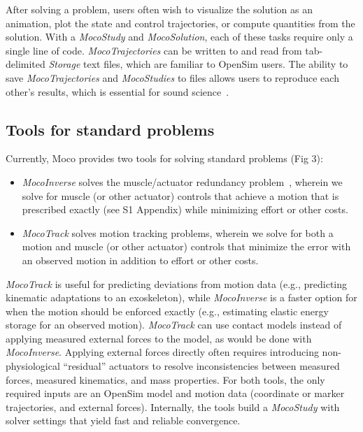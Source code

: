 \documentclass[10pt,letterpaper]{article}
\begin{document}
After solving a problem, users often wish to visualize the solution as an animation, plot the state and control trajectories, or compute quantities from the solution. With a \textit{MocoStudy} and \textit{MocoSolution}, each of these tasks require only a single line of code. \textit{MocoTrajectories} can be written to and read from tab-delimited \textit{Storage} text files, which are familiar to OpenSim users. The ability to save \textit{MocoTrajectories} and \textit{MocoStudies} to files allows users to reproduce each other’s results, which is essential for sound science~\cite{Peng:2011}.

\subsection*{Tools for standard problems}

Currently, Moco provides two tools for solving standard problems (Fig 3):
\begin{itemize}
\item \textit{\textit{MocoInverse}} solves the muscle/actuator redundancy problem~\cite{Groote:2016dq}, wherein we solve for muscle (or other actuator) controls that achieve a motion that is prescribed exactly (see S1 Appendix) while minimizing effort or other costs.
\item \textit{\textit{MocoTrack}} solves motion tracking problems, wherein we solve for both a motion and muscle (or other actuator) controls that minimize the error with an observed motion in addition to effort or other costs.
\end{itemize}
\textit{MocoTrack} is useful for predicting deviations from motion data (e.g., predicting kinematic adaptations to an exoskeleton), while \textit{MocoInverse} is a faster option for when the motion should be enforced exactly (e.g., estimating elastic energy storage for an observed motion). \textit{MocoTrack} can use contact models instead of applying measured external forces to the model, as would be done with \textit{MocoInverse}. Applying external forces directly often requires introducing non-physiological “residual” actuators to resolve inconsistencies between measured forces, measured kinematics, and mass properties. For both tools, the only required inputs are an OpenSim model and motion data (coordinate or marker trajectories, and external forces). Internally, the tools build a \textit{MocoStudy} with solver settings that yield fast and reliable convergence.
\end{document}
